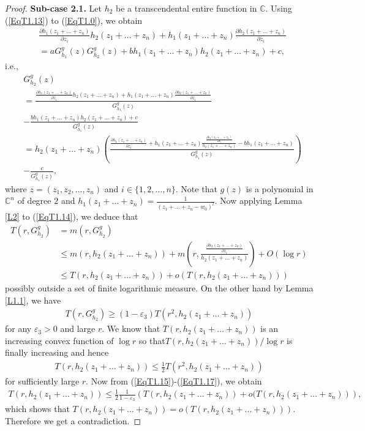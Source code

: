 \documentclass[10pt,a4paper]{amsart}
\begin{document}
\begin{proof}
\medskip
{\bf Sub-case 2.1.} Let $h_2$ be a transcendental entire function in $\mathbb{C}$. Using (\ref{EqT1.13}) to (\ref{EqT1.0}), we obtain
\begin{align}\label{EqT1.13a}
&\frac{\partial h_1(z_1+\ldots+z_n)}{\partial z_i}h_2(z_1+\ldots+z_n)+h_1(z_1+\ldots+z_n) \frac{\partial h_2(z_1+\ldots+z_n)}{\partial z_i}\\&=aG^g_{h_1}(z)G^g_{h_2}(z)+bh_1(z_1+\ldots+z_n)h_2(z_1+\ldots+z_n)+c,\nonumber
\end{align}
i.e.,
\begin{align}\label{EqT1.14}
&G^g_{h_2}(z)\\&=\frac{\frac{\partial h_1(z_1+\ldots+z_n)}{\partial z_i}h_2(z_1+\ldots+z_n)+h_1(z_1+\ldots+z_n) \frac{\partial h_2(z_1+\ldots+z_n)}{\partial z_i}}{G^g_{h_1}(z)}\nonumber\\&-\frac{bh_1(z_1+\ldots+z_n)h_2(z_1+\ldots+z_n)+c}{G^g_{h_1}(z)}\nonumber\\&=
h_2(z_1+\ldots+z_n)\left(\frac{\frac{\partial h_1(z_1+\ldots+z_n)}{\partial z_i}+h_1(z_1+\ldots+z_n) \frac{\frac{\partial h_2(z_1+\ldots+z_n)}{\partial z_i}}{h_2(z_1+\ldots+z_n)}-bh_1(z_1+\ldots+z_n)}{G^g_{h_1}(z)}\right)\nonumber\\&-\frac{c}{G^g_{h_1}(z)},\nonumber
\end{align}
where $z=(z_1,z_2,\ldots,z_n)$ and $i\in\{1,2,\ldots,n\}$. Note that $g(z)$ is a polynomial in $\mathbb{C}^n$ of degree $2$ and $h_1(z_1+\ldots+z_n)=\frac{1}{(z_1+\ldots+z_n-w_0)^l}$. Now applying Lemma \ref{L2} to (\ref{EqT1.14}), we deduce that
\begin{align}\label{EqT1.15}
T\left(r,G^g_{h_2}\right)&=m\left(r,G^g_{h_2}\right)\\&\leq m\left(r,h_2(z_1+\ldots+z_n)\right)+m\left(r,\frac{\frac{\partial h_2(z_1+\ldots+z_n)}{\partial z_i}}{h_2(z_1+\ldots+z_n)}\right)+O(\log r)\nonumber\\&
\leq T(r,h_2(z_1+\ldots+z_n))+o(T(r,h_2(z_1+\ldots+z_n)))
\end{align}
possibly outside a set of finite logarithmic measure. On the other hand by Lemma \ref{L1.1}, we have
\begin{align}\label{EqT1.16}
T\left(r,G^g_{h_2}\right)\geq (1-\varepsilon_3)T\left(r^2,h_2(z_1+\ldots+z_n)\right)
\end{align}
for any $\varepsilon_3>0$ and large $r$. We know that $T(r,h_2(z_1+\ldots+z_n))$ is an increasing convex function of $\log r$ so that$T(r,h_2(z_1+\ldots+z_n))/\log r$ is finally increasing and hence
\begin{align}\label{EqT1.17}
T(r,h_2(z_1+\ldots+z_n))\leq \frac{1}{2} T\left(r^2,h_2(z_1+\ldots+z_n)\right)
\end{align}
for sufficiently large $r$. Now from (\ref{EqT1.15})-(\ref{EqT1.17}), we obtain
\begin{align*}
T(r,h_2(z_1+\ldots+z_n))\leq \frac{1}{2}\frac{1}{1-\varepsilon_3}\left(T(r,h_2(z_1+\ldots+z_n))+o(T(r,h_2(z_1+\ldots+z_n))\right),
\end{align*}
which shows that $T(r,h_2(z_1+\ldots+z_n))=o(T(r,h_2(z_1+\ldots+z_n)))$. Therefore we get a contradiction.



\end{proof}
\end{document}
